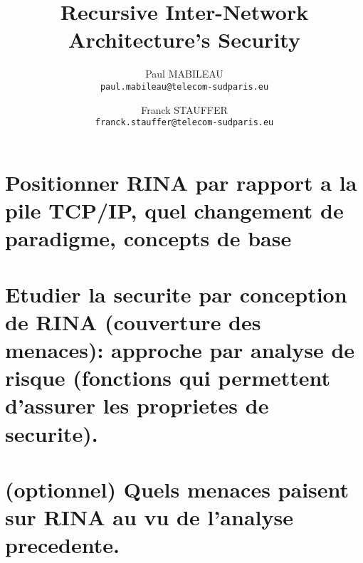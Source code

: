 \documentclass[a4paper]{proc}
\author{Paul MABILEAU\\\texttt{paul.mabileau@telecom-sudparis.eu}
        \and
    Franck STAUFFER\\\texttt{franck.stauffer@telecom-sudparis.eu}}
\title{\textbf{Recursive Inter-Network Architecture's Security}}
\date{}
\begin{document}
\maketitle
\tableofcontents
\part{Positionner RINA par rapport a la pile TCP/IP, quel changement de paradigme, concepts de base}
\part{Etudier la securite par conception de RINA (couverture des menaces): approche par analyse de risque (fonctions qui permettent d'assurer les proprietes de securite).}
\part{(optionnel) Quels menaces paisent sur RINA au vu de l'analyse precedente.}
\end{document}
